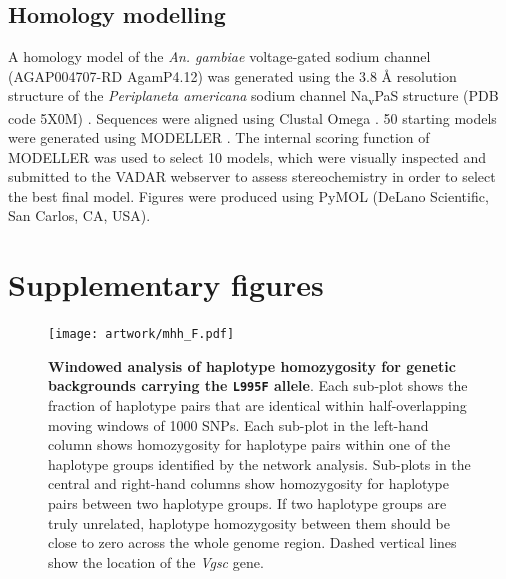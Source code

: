 \documentclass[a4paper,11pt,abstracton,hidelinks]{scrartcl}
\newcommand{\beginsupplement}{%
  \setcounter{table}{0}
  \renewcommand{\thetable}{S\arabic{table}}%
  \setcounter{figure}{0}
  \renewcommand{\thefigure}{S\arabic{figure}}%
}
\begin{document}
\subsection*{Homology modelling}

%
A homology model of the \textit{An. gambiae} voltage-gated sodium channel (AGAP004707-RD AgamP4.12) was generated using the 3.8 \r{A} resolution structure of the \textit{Periplaneta americana} sodium channel Na\textsubscript{v}PaS structure (PDB code 5X0M)  \cite{Shen2017}. 
%
Sequences were aligned using Clustal Omega \cite{Sievers2011}. 
%
50 starting models were generated using MODELLER \cite{Eswar2007}. 
%
The internal scoring function of MODELLER was used to select 10 models, which were visually inspected and submitted to the VADAR webserver \cite{Willard2003} to assess stereochemistry in order to select the best final model. 
%
Figures were produced using PyMOL (DeLano Scientific, San Carlos, CA, USA).
%




\printbibliography

\beginsupplement
\section*{Supplementary figures}

\clearpage

%
\begin{figure}[!b]
  \texttt{[image: artwork/mhh\_F.pdf]}
  \caption{\textbf{Windowed analysis of haplotype homozygosity for genetic backgrounds carrying the \texttt{L995F} allele}. Each sub-plot shows the fraction of haplotype pairs that are identical within half-overlapping moving windows of 1000 SNPs. Each sub-plot in the left-hand column shows homozygosity for haplotype pairs within one of the haplotype groups identified by the network analysis. Sub-plots in the central and right-hand columns show homozygosity for haplotype pairs between two haplotype groups. If two haplotype groups are truly unrelated, haplotype homozygosity between them should be close to zero across the whole genome region. Dashed vertical lines show the location of the \textit{Vgsc} gene.}
  \label{fig:mhh_f}
\end{figure}
\end{document}
